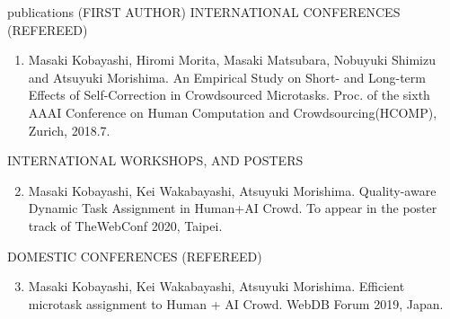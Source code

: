 \documentclass{resume} %
\begin{document}
\begin{rSection}{publications (FIRST AUTHOR)}
INTERNATIONAL CONFERENCES (REFEREED)
\begin{enumerate}
  \setcounter{enumi}{0}
  \item Masaki Kobayashi, Hiromi Morita, Masaki Matsubara, Nobuyuki Shimizu and Atsuyuki Morishima. An Empirical Study on Short- and Long-term Effects of Self-Correction in Crowdsourced Microtasks. Proc. of the sixth AAAI Conference on Human Computation and Crowdsourcing(HCOMP), Zurich, 2018.7.
\end{enumerate}

INTERNATIONAL WORKSHOPS, AND POSTERS
\begin{enumerate}
  \setcounter{enumi}{1}
  \item Masaki Kobayashi, Kei Wakabayashi, Atsuyuki Morishima. Quality-aware Dynamic Task Assignment in Human+AI Crowd. To appear in the poster track of TheWebConf 2020, Taipei.
\end{enumerate}


DOMESTIC CONFERENCES (REFEREED)
\begin{enumerate}
  \setcounter{enumi}{2}
  \item Masaki Kobayashi, Kei Wakabayashi, Atsuyuki Morishima. Efficient microtask assignment to Human + AI Crowd. WebDB Forum 2019, Japan.
\end{enumerate}


\end{rSection}
\end{document}
